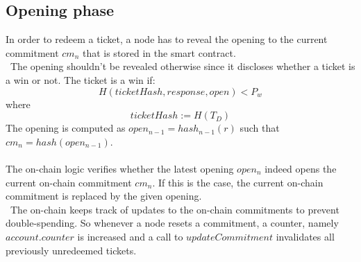 \subsection{Opening phase}
In order to redeem a ticket, a node has to reveal the opening to the current commitment $cm_n$ that is stored in the smart contract. 
\\~The opening shouldn’t be revealed otherwise since it discloses whether a ticket is a win or not.
The ticket is a win if: $$H( ticketHash, response, open ) <P_w$$ where $$ticketHash:=H(T_D)$$
The opening is computed as $open_{n-1} = hash_{n-1}(r)$ such that $cm_n=hash( open_{n-1})$. 
\\~\\The on-chain logic verifies whether the latest opening $open_n$ indeed opens the current on-chain commitment $cm_n$. 
If this is the case, the current on-chain commitment is replaced by the given opening. 
\\~The on-chain keeps track of updates to the on-chain commitments to prevent double-spending. 
So whenever a node resets a commitment, a counter, namely $account.counter$ is increased and a call to $updateCommitment$ invalidates all previously unredeemed tickets.








